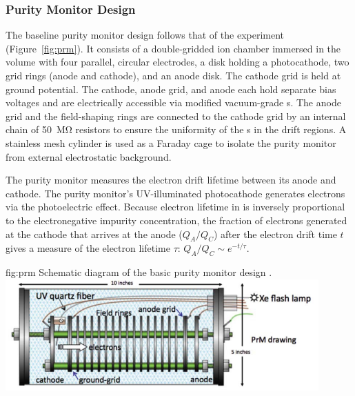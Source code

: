 \subsubsection{Purity Monitor Design}

The  baseline purity monitor design follows that of  the  experiment (Figure~\ref{fig:prm})\cite{Adamowski:2014daa}.  It consists of a double-gridded ion chamber immersed in the \lar volume with four parallel, circular electrodes, a disk holding a photocathode, two grid rings (anode and cathode), and an anode disk. The cathode grid is held at ground potential. The cathode, anode grid, and anode 
each hold separate bias voltages and are electrically accessible via modified vacuum-grade  \fdth{}s. %
The anode grid and the field-shaping rings are connected to the cathode grid by an internal chain of \SI{50}{\mega\ohm} resistors to ensure the uniformity of the \efield{}s in the drift regions. A stainless mesh cylinder is used as a Faraday cage to isolate the purity monitor from external electrostatic background. 

The purity monitor measures the electron drift lifetime between its anode and cathode. The purity monitor's UV-illuminated %
photocathode generates electrons via the photoelectric effect. Because electron lifetime in \lar is inversely proportional to the electronegative impurity concentration, the fraction of electrons generated at the cathode that arrives at the anode ($Q_A/Q_C$) after the electron drift time $t$ gives a measure of the electron lifetime $\tau$:
%
\( Q_A/Q_C \sim e^{-t/\tau}.\)



\begin{dunefigure}{fig:prm}
  {Schematic diagram of the basic purity monitor design \cite{Adamowski:2014daa}.}
  \includegraphics[width=0.9\textwidth]{graphics/PrMon_prm.pdf}
\end{dunefigure}




